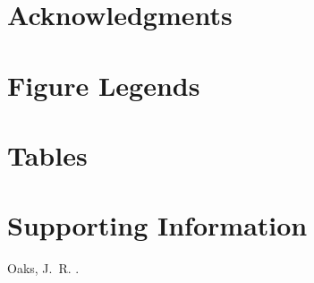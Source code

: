 \documentclass[10pt]{article}
\begin{document}

\section*{Acknowledgments}





\section*{Figure Legends}



\section*{Tables}


\newpage
\setcounter{figure}{0}
\setcounter{table}{0}
\setcounter{page}{1}
\setcounter{section}{0}

\singlespacing

\section*{Supporting Information}
\hangindent=1cm
Oaks, J.\ R. \dppTitle.

\newpage
\singlespacing


\end{document}
